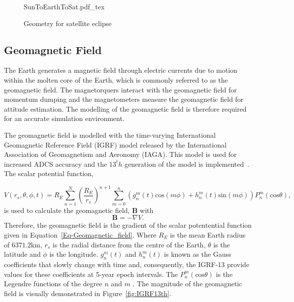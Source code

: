 \begin{figure}[!htb]
	\centering
	\def\svgwidth{12cm}
	{SunToEarthToSat.pdf_tex}
	\caption{Geometry for satellite eclipse}
	\label{fig:SunToEarthToSat}
\end{figure}


\subsection{Geomagnetic Field}

The Earth generates a magnetic field through electric currents due to motion within the molten core of the Earth, which is commonly referred to as the geomagnetic field. The magnetorquers interact with the geomagnetic field for momentum dumping and the magnetometers measure the geomagnetic field for attitude estimation. The modelling of the geomagnetic field is therefore required for an accurate simulation environment.

The geomagnetic field is modelled with the time-varying International Geomagnetic Reference Field (IGRF) model released by the International Association of Geomagnetism and Aeronomy (IAGA). This model is used for increased ADCS accuracy and the $13^th$ generation of the model is implemented~\cite{alken2021international}. The scalar potential function,

\begin{equation}
\label{Eq-Geomagnetic_field}
V(r_s,\theta, \phi, t) = R_E \sum_{n=1}^{N}\left(\frac{R_E}{r_s}\right)^{n+1}\sum_{m=0}^{n}\left(g_n^m(t)\text{cos}(m\phi) + h_n^m(t)\text{sin}(m\phi)\right)P_n^m(\text{cos}\theta),
\end{equation}
is used to calculate the geomagnetic field, $\mathbf{B}$ with
\begin{equation}
\label{Eq-Geomagnetic_field_strength}
\mathbf{B} = - \nabla V.
\end{equation}
Therefore, the geomagnetic field is the gradient of the scalar potentential function given in Equation~\ref{Eq-Geomagnetic_field}. Where $R_E$ is the mean Earth radius of $\num{6371.2}$km, $r_s$ is the radial distance from the centre of the Earth, $\theta$ is the latitude and $\phi$ is the longitude. $g_n^m(t)$ and $h_n^m(t)$ is known as the Gauss coefficients that slowly change with time and, consequently, the IGRF-13 provide values for these coefficients at 5-year epoch intervals. The $P_n^m(\text{cos}\theta)$ is the Legendre functions of the degree $n$ and $m$ \cite{winch2005geomagnetism}. The magnitude of the geomagnetic field is visually demonstrated in Figure~\ref{fig:IGRF13th}.

